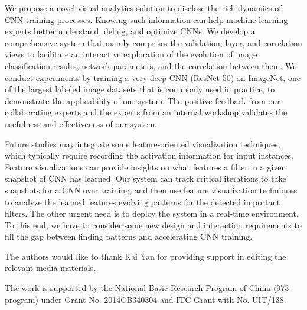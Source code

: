 \documentclass[format=acmsmall, review=false, screen=true]{acmart}
\begin{document}
We propose a novel visual analytics solution to disclose the rich dynamics of CNN training processes. Knowing such information can help machine learning experts better understand, debug, and optimize CNNs. We develop a comprehensive system that mainly comprises the validation, layer, and correlation views to facilitate an interactive exploration of the evolution of image classification results, network parameters, and the correlation between them.
We conduct experiments by training a very deep CNN (ResNet-50) on ImageNet, one of the largest labeled image datasets that is commonly used in practice, to demonstrate the applicability of our system. The positive feedback from our collaborating experts and the experts from an internal workshop validates the usefulness and effectiveness of our system.


Future studies may integrate some feature-oriented visualization techniques, which typically require recording the activation information for input instances. Feature visualizations can provide insights on what features a filter in a given snapshot of CNN has learned. Our system can track critical iterations to take snapshots for a CNN over training, and then use feature visualization techniques to analyze the learned features evolving patterns for the detected important filters. The other urgent need is to deploy the system in a real-time environment. To this end, we have to consider some new design and interaction requirements to fill the gap between finding patterns and accelerating CNN training.%

\begin{acks}
	
	The authors would like to thank Kai Yan for providing support in editing the relevant media materials.
	
	The work is supported by the National Basic Research Program of China (973 program) under Grant No. 2014CB340304
	and ITC Grant with No. UIT/138.
	
	
\end{acks}


%

\end{document}
